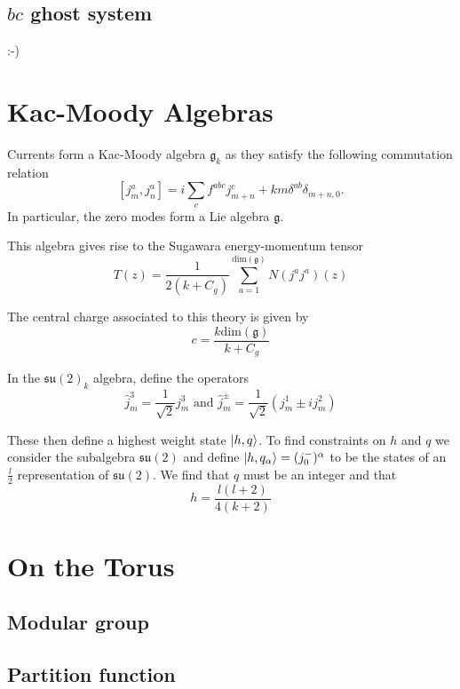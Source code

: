 \documentclass{article}
\begin{document}
\subsection{$bc$ ghost system}
:-)

\section{Kac-Moody Algebras}

Currents form a Kac-Moody algebra $\mathfrak{g}_k$ as they satisfy the following commutation relation $$[j_m^a,j_n^a]=i \sum_cf^{abc}j_{m+n}^c+km\delta^{ab}\delta_{m+n,0}.$$ In particular, the zero modes form a Lie algebra $\mathfrak{g}$. 

This algebra gives rise to the Sugawara energy-momentum tensor $$T(z)=\frac{1}{2(k+C_g)}\sum_{a=1}^{\text{dim}(\mathfrak{g})}N(j^aj^a)(z)$$

The central charge associated to this theory is given by $$c=\frac{k \text{dim}(\mathfrak{g})}{k+C_g}$$

In the $\mathfrak{su}(2)_k$ algebra, define the operators $$\hat{j}^3_m=\frac{1}{\sqrt{2}}j_m^3 \text{ and } \hat{j}^{\pm}_m=\frac{1}{\sqrt{2}}(j^1_m\pm ij^2_m)$$

These then define a highest weight state $\ket{h,q}$. To find constraints on $h$ and $q$ we consider the subalgebra $\mathfrak{su}(2)$ and define $\ket{h,q_{\alpha}}=(j_0^-)^{\alpha}$ to be the states of an $\frac{l}{2}$ representation of $\mathfrak{su}(2)$. We find that $q$ must be an integer and that $$h=\frac{l(l+2)}{4(k+2)}$$

\section{On the Torus}
\subsection{Modular group}
\subsection{Partition function}
\end{document}
